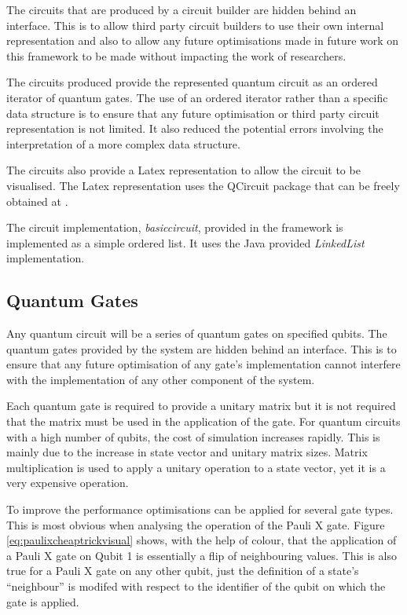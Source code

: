The circuits that are produced by a circuit builder are hidden behind an interface.
This is to allow third party circuit builders to use their own internal representation and also to allow any future optimisations made in future work on this framework to be made without impacting the work of researchers.

The circuits produced provide the represented quantum circuit as an ordered iterator of quantum gates.
The use of an ordered iterator rather than a specific data structure is to ensure that any future optimisation or third party circuit representation is not limited.
It also reduced the potential errors involving the interpretation of a more complex data structure.

The circuits also provide a Latex representation to allow the circuit to be visualised.
The Latex representation uses the QCircuit package that can be freely obtained at \cite{QCsite}.

The circuit implementation, \emph{basiccircuit}, provided in the framework is implemented as a simple ordered list.
It uses the Java provided \emph{LinkedList} implementation.

\subsection{Quantum Gates}
\label{sec:quantumgates}
Any quantum circuit will be a series of quantum gates on specified qubits.
The quantum gates provided by the system are hidden behind an interface.
This is to ensure that any future optimisation of any gate's implementation cannot interfere with the implementation of any other component of the system.

Each quantum gate is required to provide a unitary matrix but it is not required that the matrix must be used in the application of the gate.
For quantum circuits with a high number of qubits, the cost of simulation increases rapidly.
This is mainly due to the increase in state vector and unitary matrix sizes.
Matrix multiplication is used to apply a unitary operation to a state vector, yet it is a very expensive operation.

To improve the performance optimisations can be applied for several gate types.
This is most obvious when analysing the operation of the Pauli X gate.
Figure \ref{eq:paulixcheaptrickvisual} shows, with the help of colour, that the application of a Pauli X gate on Qubit 1 is essentially a flip of neighbouring values.
This is also true for a Pauli X gate on any other qubit, just the definition of a state's ``neighbour'' is modifed with respect to the identifier of the qubit on which the gate is applied.

